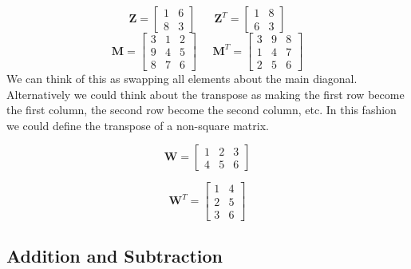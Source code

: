 \documentclass[]{book}
\theoremstyle{definition}
\theoremstyle{definition}
\theoremstyle{remark}
\begin{document}
\[
\boldsymbol{Z}=\left[\begin{array}{cc}
1 & 6\\
8 & 3
\end{array}\right]\;\;\;\;\;\;\boldsymbol{Z}^{T}=\left[\begin{array}{cc}
1 & 8\\
6 & 3
\end{array}\right]
\] \[
\boldsymbol{M}=\left[\begin{array}{ccc}
3 & 1 & 2\\
9 & 4 & 5\\
8 & 7 & 6
\end{array}\right]\;\;\;\;\;\boldsymbol{M}^{T}=\left[\begin{array}{ccc}
3 & 9 & 8\\
1 & 4 & 7\\
2 & 5 & 6
\end{array}\right]
\] We can think of this as swapping all elements about the main
diagonal. Alternatively we could think about the transpose as making the
first row become the first column, the second row become the second
column, etc. In this fashion we could define the transpose of a
non-square matrix.

\[
\boldsymbol{W}=\left[\begin{array}{ccc}
1 & 2 & 3\\
4 & 5 & 6
\end{array}\right]
\]

\[
\boldsymbol{W}^T=\left[\begin{array}{cc}
1 & 4 \\
2 & 5 \\
3 & 6
\end{array}\right]
\]

\subsection{Addition and Subtraction}\label{addition-and-subtraction}
\end{document}
